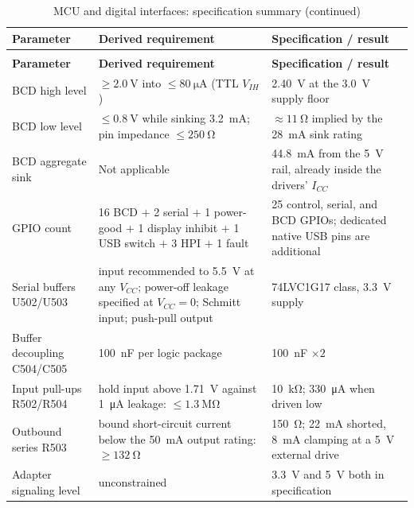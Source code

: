 {\footnotesize
\begin{longtable}{|p{}|p{}|p{}|}
\caption{MCU and digital interfaces: specification summary}\label{tab:esp32-summary}\\
\hline
\textbf{Parameter} & \textbf{Derived requirement} & \textbf{Specification / result} \\
\hline
\endfirsthead
\caption[]{MCU and digital interfaces: specification summary (continued)}\\
\hline
\textbf{Parameter} & \textbf{Derived requirement} & \textbf{Specification / result} \\
\hline
\endhead
\hline
\endlastfoot
BCD high level & $\geq\SI{2.0}{\volt}$ into
  $\leq\SI{80}{\micro\ampere}$ (TTL $V_{IH}$) & \SI{2.40}{\volt} at the
  \SI{3.0}{\volt} supply floor \\
\hline
BCD low level & $\leq\SI{0.8}{\volt}$ while sinking
  \SI{3.2}{\milli\ampere}; pin impedance $\leq\SI{250}{\ohm}$ &
  $\approx\SI{11}{\ohm}$ implied by the \SI{28}{\milli\ampere} sink rating \\
\hline
BCD aggregate sink & Not applicable & \SI{44.8}{\milli\ampere} from the 5~V rail,
  already inside the drivers' $I_{CC}$ \\
\hline
GPIO count & 16 BCD $+$ 2 serial $+$ 1 power-good $+$ 1 display inhibit $+$
  1 USB switch $+$ 3 HPI $+$ 1 fault & 25 control, serial, and BCD GPIOs;
  dedicated native USB pins are additional \\
\hline
Serial buffers U502/U503 & input recommended to \SI{5.5}{\volt} at any
  $V_{CC}$; power-off leakage specified at $V_{CC}=0$; Schmitt input;
  push-pull output & 74LVC1G17 class, 3.3~V supply \\
\hline
Buffer decoupling C504/C505 & \SI{100}{\nano\farad} per logic package &
  \SI{100}{\nano\farad} $\times 2$ \\
\hline
Input pull-ups R502/R504 & hold input above \SI{1.71}{\volt} against
  \SI{1}{\micro\ampere} leakage: $\leq\SI{1.3}{\mega\ohm}$ &
  \SI{10}{\kilo\ohm}; \SI{330}{\micro\ampere} when driven low \\
\hline
Outbound series R503 & bound short-circuit current below the
  \SI{50}{\milli\ampere} output rating: $\geq\SI{132}{\ohm}$ &
  \SI{150}{\ohm}; \SI{22}{\milli\ampere} shorted, \SI{8}{\milli\ampere}
  clamping at a 5~V external drive \\
\hline
Adapter signaling level & unconstrained & 3.3~V and 5~V both in
  specification \\
\hline

\end{longtable}}
